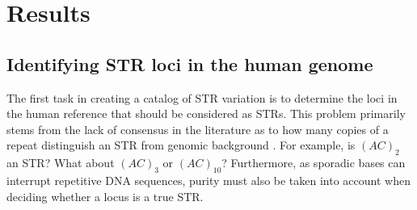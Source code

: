 \section{Results}
\subsection{Identifying STR loci in the human genome}
The first task in creating a catalog of STR variation is to determine the loci in the human reference that should be considered as STRs. This problem primarily stems from the lack of consensus in the literature as to how many copies of a repeat distinguish an STR from genomic background \cite{LeclercqRivalsJarne2007,FondonMartinRichardsEtAl2012,SchaperKajavaHauserEtAl2012}. For example, is $(AC)_2$ an STR? What about $(AC)_3$ or $(AC)_10$? Furthermore, as sporadic bases can interrupt repetitive DNA sequences, purity must also be taken into account when deciding whether a locus is a true STR.  

